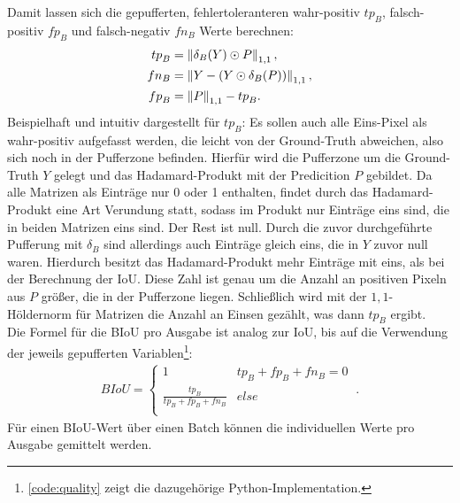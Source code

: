 Damit lassen sich die gepufferten, fehlertoleranteren wahr-positiv $tp_B$, falsch-positiv $fp_B$ und 
falsch-negativ $fn_B$ Werte berechnen: 
\begin{align}
	\label{eq:buffering} {tp}_B &= \left\lVert\delta_{B}(Y) \odot P\right\rVert_{1,1} , \\
	fn_B &= \left\lVert Y - (Y \odot \delta_{B}(P))\right\rVert_{1,1} , \\
	{fp}_B &= \left\lVert P\right\rVert_{1,1} - {tp}_B .
\end{align}
Beispielhaft und intuitiv dargestellt für $tp_B$: Es sollen auch alle Eins-Pixel als wahr-positiv aufgefasst werden,
die leicht von der Ground-Truth abweichen, also sich noch in der Pufferzone befinden. 
Hierfür wird die Pufferzone um die Ground-Truth $Y$ gelegt und das Hadamard-Produkt mit der Predicition $P$ gebildet.
Da alle Matrizen als Einträge nur 0 oder 1 enthalten, findet durch das Hadamard-Produkt eine Art Verundung statt, 
sodass im Produkt nur Einträge eins sind, die in beiden Matrizen eins sind. Der Rest ist null. 
Durch die zuvor durchgeführte Pufferung mit $\delta_B$ sind allerdings auch Einträge gleich eins, die in $Y$ 
zuvor null waren. Hierdurch besitzt das Hadamard-Produkt mehr Einträge mit eins, als bei der Berechnung der \ac{IoU}.
Diese Zahl ist genau um die Anzahl an positiven Pixeln aus $P$ größer, die in der Pufferzone liegen. 
Schließlich wird mit der $1,1$-Höldernorm für Matrizen die Anzahl an Einsen gezählt, was dann $tp_B$ ergibt. \\
Die Formel für die \ac{BIoU} pro Ausgabe ist analog zur \ac{IoU}, bis auf die Verwendung der jeweils gepufferten 
Variablen\footnote{\autoref{code:quality} zeigt die dazugehörige Python-Implementation.}:
\begin{align}
	\label{eq:quality} BIoU = \begin{cases}
		 1 & tp_B + fp_B + fn_B = 0 \\ 
		 \frac{tp_B}{tp_B + fp_B + fn_B} & else \\
	\end{cases} ~.
\end{align}
Für einen \ac{BIoU}-Wert über einen Batch können die individuellen Werte pro Ausgabe gemittelt werden.

